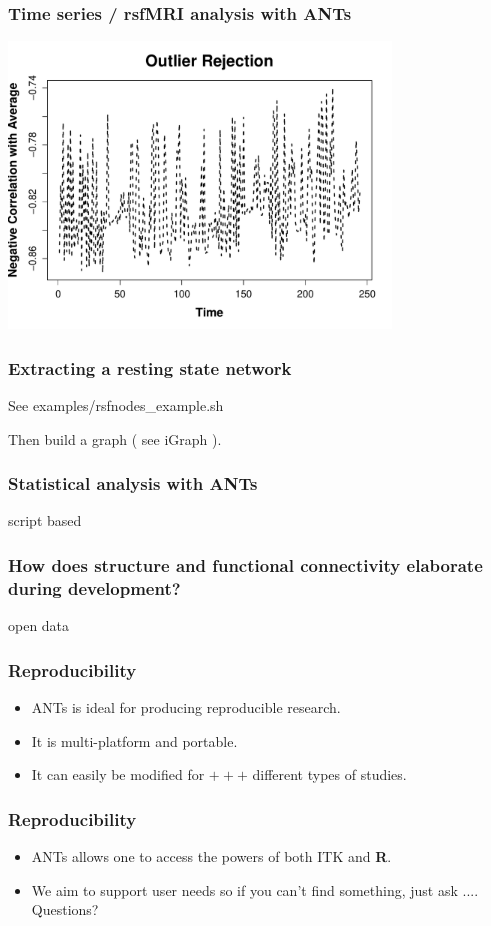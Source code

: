 \documentclass[18pt]{beamer}
\begin{document}
\begin{frame}
\frametitle{Time series / rsfMRI analysis with ANTs}
\includegraphics[width=4in]{../figures/rsfmriplot2.pdf}
\end{frame}

\begin{frame}
\frametitle{Extracting a resting state network}
See  examples/rsfnodes\_example.sh

Then build a graph ( see iGraph ).
\end{frame}


\begin{frame}
\frametitle{Statistical analysis with ANTs}
script based 
\end{frame}

\begin{frame}
\frametitle{How does structure and functional connectivity elaborate during development?}
open data
\end{frame}


\begin{frame}
\frametitle{Reproducibility}
\Huge
\begin{itemize}
\item ANTs is ideal for producing reproducible research.
\pause
\item It is multi-platform and portable.
\pause
\item It can easily be modified for $+++$ different types of studies. 
\end{itemize}
\end{frame}

\begin{frame}
\frametitle{Reproducibility}
\Huge
\begin{itemize}
\item ANTs allows one to access the powers of both ITK and {\bf
    R}. 
\pause
\item We aim to support user needs so if you can't find something,
  just ask .... Questions?
\end{itemize}
\end{frame}
\end{document}
